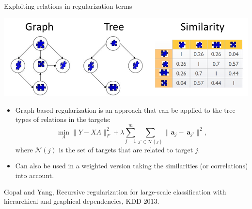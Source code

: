 \documentclass[11pt,compress,t,notes=noshow, xcolor=table]{beamer}
\newcommand{\ba}{\mathbf{a}}
\begin{document}
\begin{frame}{Exploiting relations in regularization terms}
	\footnotesize
%
	\begin{center}
		\includegraphics[width=\textwidth]{figure/targetrelations}
	\end{center} 
%	
	\begin{itemize}
%		
		\item 	Graph-based regularization is an approach that can be applied to the tree types of relations in the targets: 
		\begin{equation*}
			\min_A \|Y - XA \|^2_F + \lambda \sum_{j=1}^m \sum_{j' \in \mathcal{N}(j)} \|\ba_j - \ \ba_{j'}\|^2,
		\end{equation*}
		where $\mathcal{N}(j)$ is the set of targets that are related to target $j.$
%		
		\item Can also be used in a weighted version taking the similarities (or correlations) into account.
%		
	\end{itemize}
	
%
	{\tiny Gopal and Yang, Recursive regularization for large-scale classification with hierarchical and graphical dependencies, KDD 2013.}
\end{frame}
\end{document}
